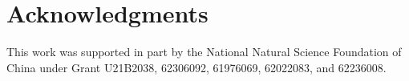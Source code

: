 \documentclass[letterpaper]{article} %
\begin{document}
\section{Acknowledgments}
This work was supported in part by the National Natural Science Foundation of China under Grant U21B2038, 62306092, 61976069, 62022083, and 62236008.%




\end{document}
